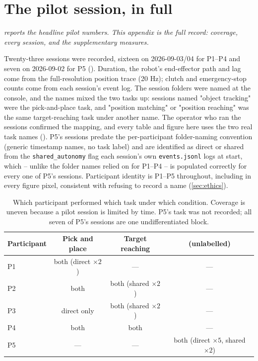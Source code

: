 \chapter{The pilot session, in full}
\label{app:pilot}

\noindent\emph{ reports the headline pilot numbers.
This appendix is the full record: coverage, every session, and the
supplementary measures.}

Twenty-three sessions were recorded, sixteen on 2026-09-03/04 for P1--P4 and
seven on 2026-09-02 for P5 (). Duration, the
robot's end-effector path and lag come from the full-resolution position trace
(20 Hz); clutch and emergency-stop counts come from each session's event
log. The session folders were named at the console, and the names mixed
the two tasks up: sessions named "object tracking" were the pick-and-place
task, and "position matching" or "position reaching" was the same
target-reaching task under another name. The operator who ran the sessions
confirmed the mapping, and every table and figure here uses the two real
task names (). P5's sessions predate the per-participant folder-naming convention
(generic timestamp names, no task label) and are identified as direct or
shared from the \texttt{shared\_autonomy} flag each session's own
\texttt{events.jsonl} logs at start, which -- unlike the folder names relied
on for P1--P4 -- is populated correctly for every one of P5's sessions.
Participant identity is P1--P5 throughout, including in every figure pixel,
consistent with  refusing to record a name
(\cref{sec:ethics}).

\begin{table}[htbp]
  \centering
  \small
  \caption[Pilot coverage]{Which participant performed which task under which
  condition. Coverage is uneven because a pilot session is limited by time.
  P5's task was not recorded; all seven of P5's sessions are one
  undifferentiated block.}
  \label{tab:pilot-coverage}
  \begin{tabular}{@{}lccc@{}}
    \toprule
    Participant & Pick and place & Target reaching & (unlabelled) \\
    \midrule
    P1 & both (direct $\times2$) & --- & --- \\
    P2 & both & both (shared $\times2$) & --- \\
    P3 & direct only & both (shared $\times2$) & --- \\
    P4 & both & both & --- \\
    P5 & --- & --- & both (direct $\times5$, shared $\times2$) \\
    \bottomrule
  \end{tabular}
\end{table}

